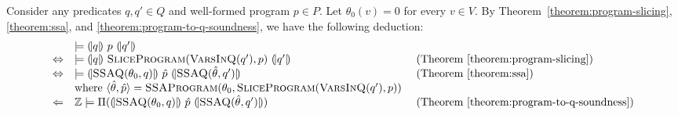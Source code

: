 
Consider any predicates $q, q' \in Q$ and well-formed program $p \in
P$. Let $\theta_0 (v) = 0$ for every $v \in V$. By
Theorem~\ref{theorem:program-slicing}, \ref{theorem:ssa}, and
\ref{theorem:program-to-q-soundness}, we have the following deduction:
\begin{equation*}
  \begin{array}{cll}
    & \models \hoaretriple{q}{p}{q'}\\
    \Leftrightarrow
    & \models 
      \hoaretriple{q}{\textsc{SliceProgram}(\textsc{VarsInQ}(q'), p)}{q'}
    & \textmd{ (Theorem~\ref{theorem:program-slicing})}\\
    \Leftrightarrow
    & \models
      \hoaretriple{\textsc{SSAQ}(\theta_0, q)}
      {\hat{p}}
      {\textsc{SSAQ}(\hat{\theta}, q')}
    & \textmd{ (Theorem~\ref{theorem:ssa})}\\
    &
      \textmd{where } \langle \hat{\theta}, \hat{p} \rangle = 
      \textsc{SSAProgram} (\theta_0, \textsc{SliceProgram}
      (\textsc{VarsInQ}(q'), p))\\
    \Leftarrow
    & \bbfZ \models \Pi (\hoaretriple{\textsc{SSAQ}(\theta_0, q)}
      {\hat{p}}
      {\textsc{SSAQ}(\hat{\theta}, q')})
    & \textmd{ (Theorem~\ref{theorem:program-to-q-soundness})}
  \end{array}
\end{equation*}
